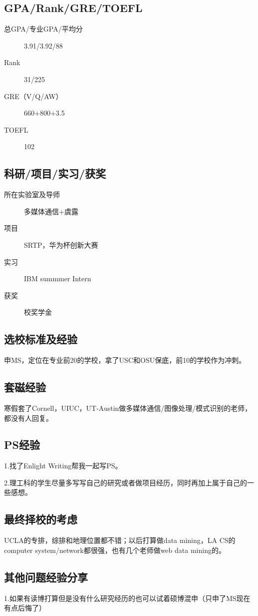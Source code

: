 \documentclass[11pt,fleqn,openany]{book} %
\begin{document}
\subsection*{GPA/Rank/GRE/TOEFL}
\begin{description}
\item[总GPA/专业GPA/平均分] 3.91/3.92/88
\item[Rank] 31/225
\item[GRE（V/Q/AW）] 660+800+3.5
\item[TOEFL] 102
\end{description}

\subsection*{科研/项目/实习/获奖}
\begin{description}
\item[所在实验室及导师] 多媒体通信+虞露
\item[项目] SRTP，华为杯创新大赛
\item[实习] IBM summmer Intern
\item[获奖] 校奖学金
\end{description}
\subsection*{选校标准及经验}
申MS，定位在专业前20的学校，拿了USC和OSU保底，前10的学校作为冲刺。
\subsection*{套磁经验}
寒假套了Cornell，UIUC，UT-Austin做多媒体通信/图像处理/模式识别的老师，都没有人回复。
\subsection*{PS经验}
1.找了Enlight Writing帮我一起写PS。

2.理工科的学生尽量多写写自己的研究或者做项目经历，同时再加上属于自己的一些感想。
\subsection*{最终择校的考虑}
UCLA的专排，综排和地理位置都不错；以后打算做data mining，LA CS的computer system/network都很强，也有几个老师做web data mining的。
\subsection*{其他问题经验分享}
1.如果有读博打算但是没有什么研究经历的也可以试着硕博混申（只申了MS现在有点后悔了）
\end{document}
